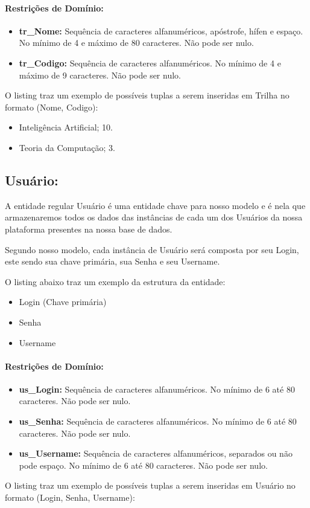 \documentclass{report}
\begin{document}
\paragraph{Restrições de Domínio:}
\begin{itemize}
  \item \textbf{tr\_Nome:} Sequência de caracteres alfanuméricos, apóstrofe, hífen e espaço. No mínimo de 4 e máximo de 80 caracteres. Não pode ser nulo.
  \item \textbf{tr\_Codigo:} Sequência de caracteres alfanuméricos. No mínimo de 4 e máximo de 9 caracteres. Não pode ser nulo.
\end{itemize}
O listing traz um exemplo de possíveis tuplas a serem inseridas em Trilha no formato (Nome, Codigo):

\begin{itemize}
  \item Inteligência Artificial; 10. 
  \item Teoria da Computação; 3.
\end{itemize}
\subsection{Usuário:}
  A entidade regular Usuário é uma entidade chave para nosso modelo e é nela que armazenaremos todos os dados das instâncias de cada um dos Usuários da nossa plataforma presentes na nossa base de dados.
  
  Segundo nosso modelo, cada instância de Usuário será composta por seu Login, este sendo sua chave primária, sua Senha e seu Username.
    
  O listing abaixo traz um exemplo da estrutura da entidade:
\begin{itemize}
  \item Login (Chave primária)
  \item Senha
  \item Username
\end{itemize}
\paragraph{Restrições de Domínio:}
\begin{itemize}
  \item \textbf{us\_Login:} Sequência de caracteres alfanuméricos. No mínimo de 6 até 80 caracteres. Não pode ser nulo.
  \item \textbf{us\_Senha:}  Sequência de caracteres alfanuméricos. No mínimo de 6 até 80 caracteres. Não pode ser nulo.
  \item \textbf{us\_Username:} Sequência de caracteres alfanuméricos, separados ou não pode espaço. No mínimo de 6 até 80 caracteres. Não pode ser nulo.
\end{itemize}
O listing traz um exemplo de possíveis tuplas a serem inseridas em Usuário no formato (Login, Senha, Username):
\end{document}
